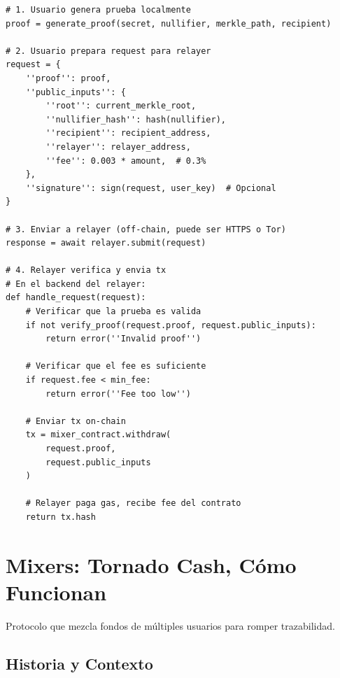 \documentclass[11pt,a4paper,twoside]{book}
\begin{document}
\begin{example}
\begin{lstlisting}[style=python]
# 1. Usuario genera prueba localmente
proof = generate_proof(secret, nullifier, merkle_path, recipient)

# 2. Usuario prepara request para relayer
request = {
    ''proof'': proof,
    ''public_inputs'': {
        ''root'': current_merkle_root,
        ''nullifier_hash'': hash(nullifier),
        ''recipient'': recipient_address,
        ''relayer'': relayer_address,
        ''fee'': 0.003 * amount,  # 0.3%
    },
    ''signature'': sign(request, user_key)  # Opcional
}

# 3. Enviar a relayer (off-chain, puede ser HTTPS o Tor)
response = await relayer.submit(request)

# 4. Relayer verifica y envia tx
# En el backend del relayer:
def handle_request(request):
    # Verificar que la prueba es valida
    if not verify_proof(request.proof, request.public_inputs):
        return error(''Invalid proof'')
    
    # Verificar que el fee es suficiente
    if request.fee < min_fee:
        return error(''Fee too low'')
    
    # Enviar tx on-chain
    tx = mixer_contract.withdraw(
        request.proof,
        request.public_inputs
    )
    
    # Relayer paga gas, recibe fee del contrato
    return tx.hash
\end{lstlisting}
\end{example}

\section{Mixers: Tornado Cash, C\'omo Funcionan}

\begin{definition}[Mixer]
Protocolo que mezcla fondos de m\'ultiples usuarios para romper trazabilidad.
\end{definition}

\subsection{Historia y Contexto}
\end{document}
